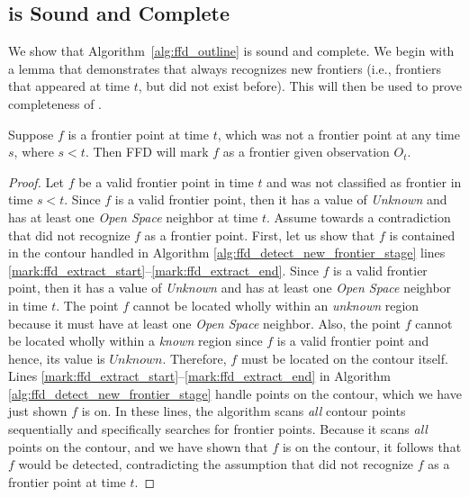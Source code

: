 \subsection{\FFD is Sound and Complete}
\label{section:ffd_sound_and_complete}
We show that Algorithm~\ref{alg:ffd_outline} is sound and complete.
We begin with a lemma that demonstrates that \FFD always recognizes new
frontiers (i.e., frontiers that appeared at time $t$, but did not exist before).
This will then be used to prove completeness of \FFD.
\begin{lemma}
\label{lem:newf}
Suppose $f$ is a frontier point at time $t$, which was not a frontier point at
any time $s$, where $s<t$. Then FFD will mark $f$ as a frontier given
observation $O_t$.
\end{lemma}
\begin{proof}
Let $f$ be a valid frontier point in time $t$ and was not classified as
frontier in time $s<t$. Since $f$ is a valid frontier point, then it has a
value of \emph{Unknown} and has at least one \emph{Open Space} neighbor at time
$t$. 
Assume towards a contradiction that \FFD did not recognize $f$ as a frontier
point. First, let us show that $f$ is contained in the contour handled
in Algorithm \ref{alg:ffd_detect_new_frontier_stage} lines
\ref{mark:ffd_extract_start}--\ref{mark:ffd_extract_end}.
Since $f$ is a valid frontier point, then it has a value
of \emph{Unknown} and has at least one \emph{Open Space} neighbor in time
$t$. The point $f$ cannot be located wholly within an \textit{unknown} region because it must
have at least one \emph{Open Space} neighbor. Also, the point $f$ cannot be
located wholly within a \textit{known} region since $f$ is a valid frontier point and
hence, its value is $Unknown$. Therefore, $f$ must be located on the contour
itself.
Lines \ref{mark:ffd_extract_start}--\ref{mark:ffd_extract_end} in Algorithm
\ref{alg:ffd_detect_new_frontier_stage} handle points on the contour, which we
have just shown $f$ is on. In these lines, the \FFD algorithm scans \emph{all}
contour points sequentially and specifically searches for frontier points.
Because it scans \emph{all} points on the contour, and we have shown that $f$
is on the contour, it follows that $f$ would be detected, contradicting the
assumption that \FFD did not recognize $f$ as a frontier point at time $t$.
\end{proof}

